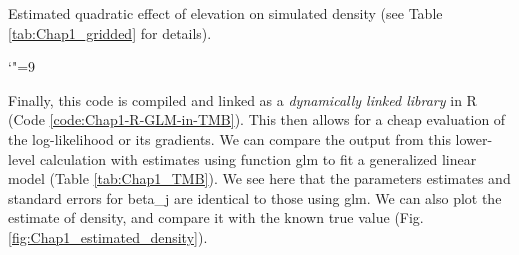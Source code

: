 \lstset{style=Rcode}


\begin{table}
  \caption[Estimated effect of elevation in gridded density using TMB]{Estimated quadratic effect of elevation on simulated density (see Table \ref{tab:Chap1_gridded} for details).}
  \catcode`"=9
  \centering
  \label{tab:Chap1_TMB}
\end{table}

Finally, this code is compiled and linked as a \textit{dynamically linked library} in R (Code \ref{code:Chap1-R-GLM-in-TMB}).  This then allows for a cheap evaluation of the log-likelihood or its gradients. We can compare the output from this lower-level calculation with estimates using function \colorbox{backcolour}{glm} to fit a generalized linear model  (Table \ref{tab:Chap1_TMB}). We see here that the parameters estimates and standard errors for \colorbox{backblue}{beta\_j} are identical to those using \colorbox{backcolour}{glm}.  We can also plot the estimate of density, and compare it with the known true value (Fig. \ref{fig:Chap1_estimated_density}).

